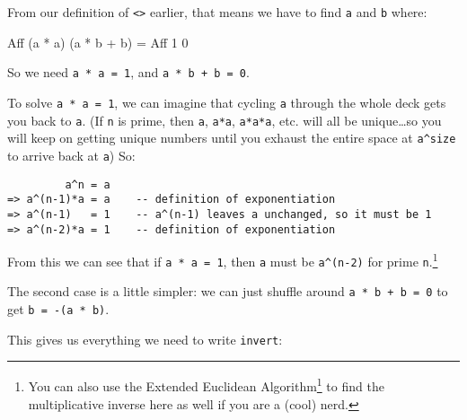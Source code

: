 \documentclass[]{article}
\newenvironment{Shaded}{}{}
\newcommand{\DataTypeTok}[1]{\textcolor[rgb]{0.56,0.13,0.00}{#1}}
\newcommand{\DecValTok}[1]{\textcolor[rgb]{0.25,0.63,0.44}{#1}}
\newcommand{\NormalTok}[1]{#1}
\newcommand{\OperatorTok}[1]{\textcolor[rgb]{0.40,0.40,0.40}{#1}}
\newcommand{\OtherTok}[1]{\textcolor[rgb]{0.00,0.44,0.13}{#1}}
\renewcommand{\href}[2]{#2\footnote{\url{#1}}}
\begin{document}
From our definition of \texttt{\textless{}\textgreater{}} earlier, that means we
have to find \texttt{a\textquotesingle{}} and \texttt{b\textquotesingle{}}
where:

\begin{Shaded}
\begin{Highlighting}[]
\DataTypeTok{Aff}\NormalTok{ (a\textquotesingle{} }\OperatorTok{*}\NormalTok{ a) (a\textquotesingle{} }\OperatorTok{*}\NormalTok{ b }\OperatorTok{+}\NormalTok{ b\textquotesingle{}) }\OtherTok{=} \DataTypeTok{Aff} \DecValTok{1} \DecValTok{0}
\end{Highlighting}
\end{Shaded}

So we need \texttt{a\textquotesingle{}\ *\ a\ =\ 1}, and
\texttt{a\textquotesingle{}\ *\ b\ +\ b\textquotesingle{}\ =\ 0}.

To solve \texttt{a\textquotesingle{}\ *\ a\ =\ 1}, we can imagine that cycling
\texttt{a} through the whole deck gets you back to \texttt{a}. (If \texttt{n} is
prime, then \texttt{a}, \texttt{a*a}, \texttt{a*a*a}, etc. will all be
unique\ldots so you will keep on getting unique numbers until you exhaust the
entire space at \texttt{a\^{}size} to arrive back at \texttt{a}) So:

\begin{verbatim}
         a^n = a
=> a^(n-1)*a = a    -- definition of exponentiation
=> a^(n-1)   = 1    -- a^(n-1) leaves a unchanged, so it must be 1
=> a^(n-2)*a = 1    -- definition of exponentiation
\end{verbatim}

From this we can see that if \texttt{a\textquotesingle{}\ *\ a\ =\ 1}, then
\texttt{a\textquotesingle{}} must be \texttt{a\^{}(n-2)} for prime
\texttt{n}.\footnote{You can also use the
  \href{https://en.wikipedia.org/wiki/Extended_Euclidean_algorithm}{Extended
  Euclidean Algorithm} to find the multiplicative inverse here as well if you
  are a (cool) nerd.}

The second case is a little simpler: we can just shuffle around
\texttt{a\textquotesingle{}\ *\ b\ +\ b\textquotesingle{}\ =\ 0} to get
\texttt{b\textquotesingle{}\ =\ -(a\textquotesingle{}\ *\ b)}.

This gives us everything we need to write \texttt{invert}:
\end{document}

